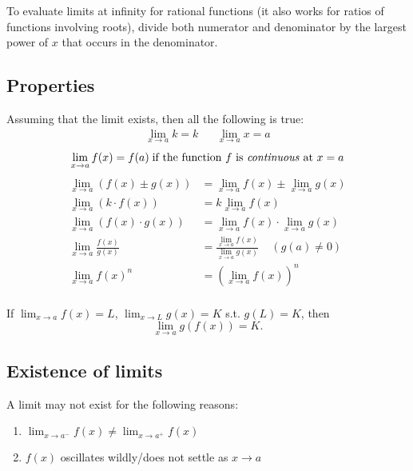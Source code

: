 \documentclass[main.tex]{subfiles}
\begin{document}
	\begin{note}
	To evaluate limits at infinity for rational functions (it also works for ratios of functions involving roots), divide both numerator and denominator by the largest power of \(x\) that occurs in the denominator.
	\end{note}

	\subsection*{Properties}
	Assuming that the limit exists, then all the following is true:
	\begin{align*}
		\lim_{x \to a} k = k && \lim_{x \to a} x = a
	\end{align*}
	\begin{equation*}
		\lim_{x \to a} f(x) = f(a) \; \text{if the function \(f\) is \emph{continuous} at \(x = a\)}
	\end{equation*}
	\begin{align*}
		\lim_{x \to a}(f(x) \pm g(x)) &= \lim_{x \to a}f(x) \pm \lim_{x \to a}g(x) \\
		\lim_{x \to a}(k \cdot f(x)) &= k \lim_{x \to a}f(x) \\
		\lim_{x \to a}(f(x) \cdot g(x)) &= \lim_{x \to a}{f(x)} \cdot \lim_{x \to a}{g(x)} \\
		\lim_{x \to a} \frac{f(x)}{g(x)} &= \frac{\lim_{x \to a} f(x)}{\lim_{x \to a} g(x)} \;\;\;\; (g(a) \neq 0) \\
		\lim_{x \to a}f(x)^n &= \left( \lim_{x \to a}{f(x)}\right)^n \\
	\end{align*}

	If \(\displaystyle \lim_{x \to a} f(x) = L\), \(\displaystyle \lim_{x \to L} g(x) = K\) s.t. \(g(L) = K\), then
	\begin{equation*}
		\lim_{x \to a} g(f(x)) = K.
	\end{equation*}


	\subsection*{Existence of limits}
	A limit may not exist for the following reasons:
	\begin{enumerate}
		\item \(\lim_{x \to a^{-}}{f(x)} \neq \lim_{x \to a^{+}}{f(x)}\)
		\item \(f(x)\) oscillates wildly/does not settle as \(x \to a\)
	\end{enumerate}
\end{document}
